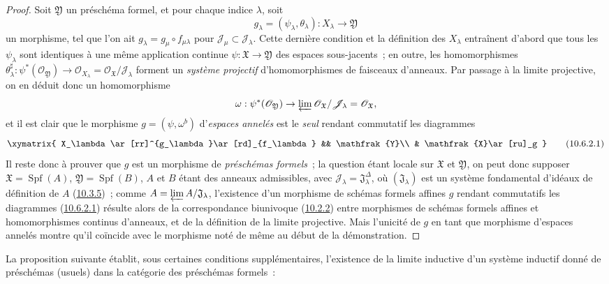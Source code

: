 \begin{proof}
Soit $\mathfrak{Y}$ un préschéma formel, et pour chaque indice $\lambda$,
soit
\[
  g_\lambda=(\psi_\lambda,\theta_\lambda):X_\lambda\to\mathfrak{Y}
\]
un morphisme, tel que l'on ait
$g_\lambda=g_\mu\circ f_{\mu\lambda}$ pour
$\mathscr{J}_\mu\subset\mathscr{J}_\lambda$. Cette dernière condition
et la définition des $X_\lambda$ entraînent d'abord que tous les
$\psi_\lambda$ sont identiques à une même application continue
$\psi:\mathfrak{X}\to\mathfrak{Y}$ des espaces sous-jacents~; en outre,
les homomorphismes
$\theta_\lambda^\sharp:\psi^*(\mathscr{O}_{\mathfrak{Y}})\to
\mathscr{O}_{X_\lambda}=
\mathscr{O}_{\mathfrak{X}}/\mathscr{J}_\lambda$ forment un
\emph{système projectif} d'homomorphismes de faisceaux d'anneaux. Par
passage à la limite projective, on en déduit donc un homomorphisme
\[
  \omega:\psi^*(\mathscr{O}_{\mathfrak{Y}})\to
  \varprojlim\mathscr{O}_{\mathfrak{X}}/\mathscr{J}_\lambda
  =\mathscr{O}_{\mathfrak{X}},
\]
et il est clair que le morphisme $g=(\psi,\omega^b)$ d'\emph{espaces
annelés} est le \emph{seul} rendant commutatif les diagrammes
\[
  \label{I.10.6.2.1-fr}
  \xymatrix{
    X_\lambda\ar[rr]^{g_\lambda}\ar[rd]_{f_\lambda} &&
    \mathfrak{Y}\\
    & \mathfrak{X}\ar[ru]_g
  }
  \tag{10.6.2.1}
\]
Il reste donc à prouver que $g$ est un morphisme de \emph{préschémas
formels}~; la question étant locale sur $\mathfrak{X}$ et
$\mathfrak{Y}$, on peut donc supposer
$\mathfrak{X}=\operatorname{Spf}(A)$,
$\mathfrak{Y}=\operatorname{Spf}(B)$, $A$ et $B$ étant des anneaux
admissibles, avec
$\mathscr{J}_\lambda=\mathfrak{J}_\lambda^{\Delta}$, où
$(\mathfrak{J}_\lambda)$ est un système fondamental d'idéaux de
définition de $A$ (\hyperref[I.10.3.5-fr]{10.3.5})~; comme
$A=\varprojlim A/\mathfrak{J}_\lambda$, l'existence d'un morphisme de
schémas formels affines $g$ rendant commutatifs les diagrammes
(\hyperref[I.10.6.2.1-fr]{10.6.2.1}) résulte alors de la correspondance
biunivoque (\hyperref[I.10.2.2-fr]{10.2.2}) entre morphismes de schémas
formels affines et homomorphismes continus d'anneaux, et de la définition
de la limite projective. Mais l'unicité de $g$ en tant que morphisme
d'espaces annelés montre qu'il coïncide avec le morphisme noté de même au
début de la démonstration.
\end{proof}

La proposition suivante établit, sous certaines conditions
supplémentaires, l'existence de la limite inductive d'un système inductif
donné de préschémas (usuels) dans la catégorie des préschémas formels~:

